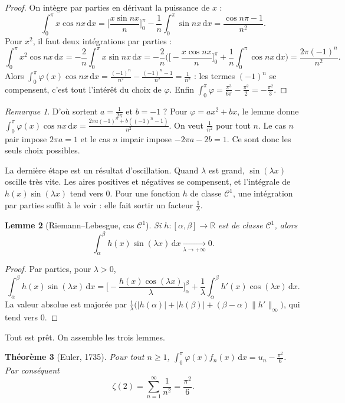 \documentclass[11pt,a4paper]{article}
\theoremstyle{plain}
\newtheorem{theoreme}{Théorème}[section]
\newtheorem{lemme}[theoreme]{Lemme}
\theoremstyle{definition}
\theoremstyle{remark}
\newtheorem{remarque}[theoreme]{Remarque}
\newcommand{\R}{\mathbb{R}}
\newcommand{\dd}{\,\mathrm{d}}
\begin{document}
\begin{proof}
On intègre par parties en dérivant la puissance de $x$ :
\[
  \int_0^\pi x\cos nx\dd x=\Big[\frac{x\sin nx}n\Big]_0^\pi-\frac1n\int_0^\pi\sin nx\dd x=\frac{\cos n\pi-1}{n^2}.
\]
Pour $x^2$, il faut deux intégrations par parties :
\[
  \int_0^\pi x^2\cos nx\dd x=-\frac2n\int_0^\pi x\sin nx\dd x=-\frac2n\Big(\Big[-\frac{x\cos nx}{n}\Big]_0^\pi+\frac1n\int_0^\pi\cos nx\dd x\Big)=\frac{2\pi(-1)^n}{n^2}.
\]
Alors $\int_0^\pi\varphi(x)\cos nx\dd x=\frac{(-1)^n}{n^2}-\frac{(-1)^n-1}{n^2}=\frac1{n^2}$ : les termes $(-1)^n$ se compensent, c'est tout l'intérêt du choix de $\varphi$. Enfin $\int_0^\pi\varphi=\frac{\pi^3}{6\pi}-\frac{\pi^2}2=-\frac{\pi^2}3$.
\end{proof}

\begin{remarque}
D'où sortent $a=\frac1{2\pi}$ et $b=-1$ ? Pour $\varphi=ax^2+bx$, le lemme donne $\int_0^\pi\varphi(x)\cos nx\dd x=\frac{2\pi a(-1)^n+b((-1)^n-1)}{n^2}$. On veut $\frac1{n^2}$ pour tout $n$. Le cas $n$ pair impose $2\pi a=1$ et le cas $n$ impair impose $-2\pi a-2b=1$. Ce sont donc les seuls choix possibles.
\end{remarque}

La dernière étape est un résultat d'oscillation. Quand $\lambda$ est grand, $\sin(\lambda x)$ oscille très vite. Les aires positives et négatives se compensent, et l'intégrale de $h(x)\sin(\lambda x)$ tend vers $0$. Pour une fonction $h$ de classe $\mathcal C^1$, une intégration par parties suffit à le voir : elle fait sortir un facteur $\frac1\lambda$.

\begin{lemme}[Riemann--Lebesgue, cas $\mathcal C^1$]\label{lem:rl}
Si $h\colon[\alpha,\beta]\to\R$ est de classe $\mathcal C^1$, alors
\[
  \int_\alpha^\beta h(x)\sin(\lambda x)\dd x\xrightarrow[\lambda\to+\infty]{}0 .
\]
\end{lemme}

\begin{proof}
Par parties, pour $\lambda>0$,
\[
  \int_\alpha^\beta h(x)\sin(\lambda x)\dd x=\Big[-\frac{h(x)\cos(\lambda x)}{\lambda}\Big]_\alpha^\beta+\frac1\lambda\int_\alpha^\beta h'(x)\cos(\lambda x)\dd x .
\]
La valeur absolue est majorée par $\frac{1}{\lambda}\big(|h(\alpha)|+|h(\beta)|+(\beta-\alpha)\|h'\|_\infty\big)$, qui tend vers $0$.
\end{proof}

Tout est prêt. On assemble les trois lemmes.

\begin{theoreme}[Euler, 1735]\label{thm:basel}
Pour tout $n\geq1$, $\displaystyle\int_0^\pi\varphi(x)f_n(x)\dd x=u_n-\frac{\pi^2}6$. Par conséquent
\[
  \zeta(2)=\sum_{n=1}^{\infty}\frac1{n^2}=\frac{\pi^2}6 .
\]
\end{theoreme}
\end{document}
